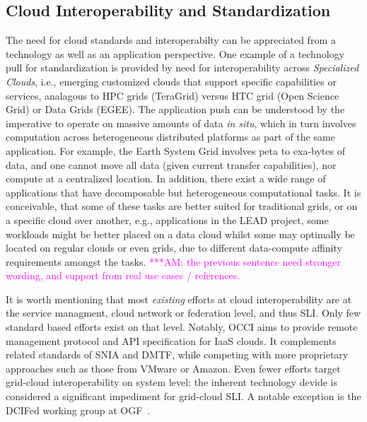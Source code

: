 \documentclass[10pt,conference,final,letterpaper,twoside,twocolumn,]{IEEEtran}
\newcommand{\amnote}[1]{  {\textcolor{magenta} {***AM: #1}}}
\newcommand{\amnote}[1]{}
\newcommand{\I}[1]{\textit{#1}}
\begin{document}
 \subsection*{Cloud Interoperability and Standardization}

 The need for cloud standards and interoperabilty can be appreciated
 from a technology as well as an application perspective. One example
 of a technology pull for standardization is provided by need for
 interoperability across {\it Specialized Clouds}, i.e., emerging
 customized clouds that support specific capabilities or services,
 analagous to HPC grids (TeraGrid) versus HTC grid (Open Science Grid)
 or Data Grids (EGEE).  The application push can be understood by the
 imperative to operate on massive amounts of data {\it in situ}, which
 in turn involves computation across heterogeneous distributed
 platforms as part of the same application.  For example, the Earth
 System Grid involves peta to exa-bytes of data, and one cannot move
 all data (given current transfer capabilities), nor compute at a
 centralized location.  In addition, there exist a wide range of
 applications that have decomposable but heterogeneous computational
 tasks. It is conceivable, that some of these tasks are better suited
 for traditional grids, or on a specific cloud over another, e.g.,
 applications in the LEAD project, some workloads might be better
 placed on a data cloud whilst some may optimally be located on
 regular clouds or even grids, due to different data-compute affinity
 requirements amongst the tasks. \amnote{the previous sentence need
 stronger wording, and support from real use cases / references.}

 It is worth mentioning that most \I{existing} efforts at cloud
 interoperability are at the service managment, cloud network or
 federation level, and thus SLI.  Only few standard based efforts
 exist on that level.  Notably, OCCI aims to provide remote management
 protocol and API specification for IaaS clouds.  It complements
 related standards of SNIA and DMTF, while competing with more
 proprietary approaches such as those from VMware or Amazon.  Even
 fewer efforts target grid-cloud interoperability on system level: the
 inherent technology devide is considered a significant impediment for
 grid-cloud SLI.  A notable exception is the DCIFed working group at
 OGF~\cite{dcifed-www}.
 
\end{document}
